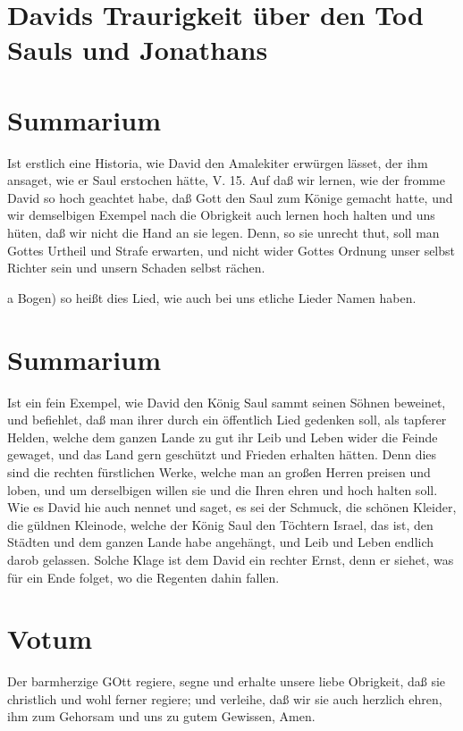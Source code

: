 \section{Davids Traurigkeit über den Tod Sauls und Jonathans}

\section{Summarium}

Ist erstlich eine Historia, wie David den Amalekiter erwürgen lässet, der ihm ansaget, wie er Saul erstochen hätte, V. 15. Auf daß wir lernen, wie der fromme David so hoch geachtet habe, daß Gott den Saul zum Könige gemacht hatte, und wir demselbigen Exempel nach die Obrigkeit auch lernen hoch halten und uns hüten, daß wir nicht die Hand an sie legen. Denn, so sie unrecht thut, soll man Gottes Urtheil und Strafe erwarten, und nicht wider Gottes Ordnung unser selbst Richter sein und unsern Schaden selbst rächen.

a Bogen) so heißt dies Lied, wie auch bei uns etliche Lieder Namen haben.

\section{Summarium}

Ist ein fein Exempel, wie David den König Saul sammt seinen Söhnen beweinet, und befiehlet, daß man ihrer durch ein öffentlich Lied gedenken soll, als tapferer Helden, welche dem ganzen Lande zu gut ihr Leib und Leben wider die Feinde gewaget, und das Land gern geschützt und Frieden erhalten hätten. Denn dies sind die rechten fürstlichen Werke, welche man an großen Herren preisen und loben, und um derselbigen willen sie und die Ihren ehren und hoch halten soll. Wie es David hie auch nennet und saget, es sei der Schmuck, die schönen Kleider, die güldnen Kleinode, welche der König Saul den Töchtern Israel, das ist, den Städten und dem ganzen Lande habe angehängt, und Leib und Leben endlich darob gelassen. Solche Klage ist dem David ein rechter Ernst, denn er siehet, was für ein Ende folget, wo die Regenten dahin fallen.

\section{Votum}

Der barmherzige GOtt regiere, segne und erhalte unsere liebe Obrigkeit, daß sie christlich und wohl ferner regiere; und verleihe, daß wir sie auch herzlich ehren, ihm zum Gehorsam und uns zu gutem Gewissen, Amen.


